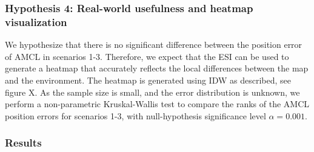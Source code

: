 \subsubsection{\textbf{Hypothesis 4: Real-world usefulness and heatmap visualization}} 
We hypothesize that there is no significant difference between the position error of AMCL in scenarios 1-3. 
Therefore, we expect that the ESI can be used to generate a heatmap that accurately reflects the local differences between the map and the environment.
The heatmap is generated using IDW as described, see figure X.
As the sample size is small, and the error distribution is unknown, 
we perform a non-parametric Kruskal-Wallis test to compare the ranks of the AMCL position errors for scenarios 1-3, 
with null-hypothesis significance level $\alpha=0.001$.

\subsubsection{\textbf{Results}}

\begin{table}[!h]
    \begin{center}
    \caption{\footnotesize{ESI results for the real-world experiment. 1) No changes, 2) Light changes, 3) Moderate changes, 4) Significant changes. Rows marked with * have units \textnormal{[mm]} and \textnormal{[°]}, respectively.}}
    \label{table:real_world_esi_results}
    \end{center}
    \end{table}

